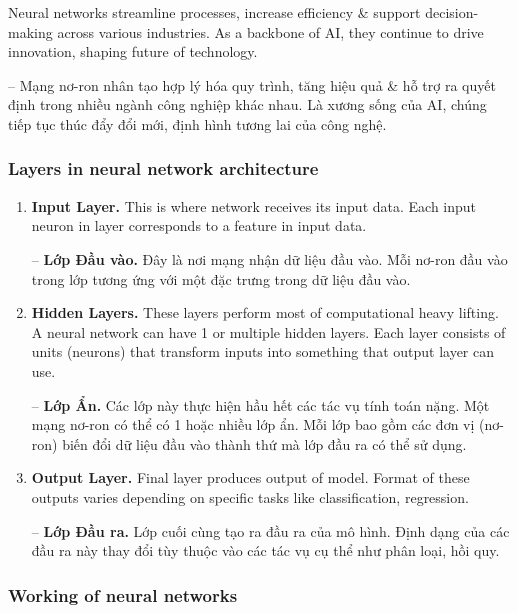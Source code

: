 \documentclass{article}
\begin{document}
Neural networks streamline processes, increase efficiency \& support decision-making across various industries. As a backbone of AI, they continue to drive innovation, shaping future of technology.

-- Mạng nơ-ron nhân tạo hợp lý hóa quy trình, tăng hiệu quả \& hỗ trợ ra quyết định trong nhiều ngành công nghiệp khác nhau. Là xương sống của AI, chúng tiếp tục thúc đẩy đổi mới, định hình tương lai của công nghệ.


\subsubsection{Layers in neural network architecture}

\begin{enumerate}
    \item {\bf Input Layer.} This is where network receives its input data. Each input neuron in layer corresponds to a feature in input data.

    -- {\bf Lớp Đầu vào.} Đây là nơi mạng nhận dữ liệu đầu vào. Mỗi nơ-ron đầu vào trong lớp tương ứng với một đặc trưng trong dữ liệu đầu vào.
    \item {\bf Hidden Layers.} These layers perform most of computational heavy lifting. A neural network can have 1 or multiple hidden layers. Each layer consists of units (neurons) that transform inputs into something that output layer can use.

    -- {\bf Lớp Ẩn.} Các lớp này thực hiện hầu hết các tác vụ tính toán nặng. Một mạng nơ-ron có thể có 1 hoặc nhiều lớp ẩn. Mỗi lớp bao gồm các đơn vị (nơ-ron) biến đổi dữ liệu đầu vào thành thứ mà lớp đầu ra có thể sử dụng.
    \item {\bf Output Layer.} Final layer produces output of model. Format of these outputs varies depending on specific tasks like classification, regression.

    -- {\bf Lớp Đầu ra.} Lớp cuối cùng tạo ra đầu ra của mô hình. Định dạng của các đầu ra này thay đổi tùy thuộc vào các tác vụ cụ thể như phân loại, hồi quy.
\end{enumerate}


\subsubsection{Working of neural networks}
\end{document}
